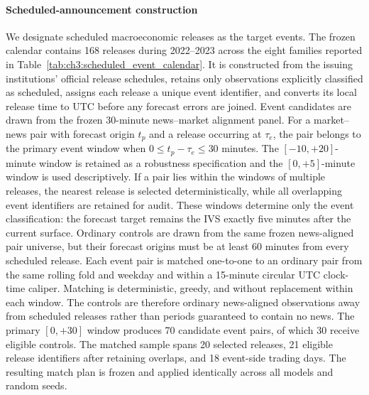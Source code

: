\paragraph*{Scheduled-announcement construction}
We designate scheduled macroeconomic releases as the target events.  The
frozen calendar contains 168 releases during 2022--2023 across the eight
families reported in Table~\ref{tab:ch3:scheduled_event_calendar}.  It is
constructed from the issuing institutions' official release schedules,
retains only observations explicitly classified as scheduled, assigns each
release a unique event identifier, and converts its local release time to UTC
before any forecast errors are joined.  Event candidates are drawn from the
frozen 30-minute news--market alignment panel.  For a market--news pair with
forecast origin $t_p$ and a release occurring at $\tau_e$, the pair belongs to
the primary event window when $0\leq t_p-\tau_e\leq30$ minutes.  The
$[-10,+20]$-minute window is retained as a robustness specification and the
$[0,+5]$-minute window is used descriptively.  If a pair lies within the
windows of multiple releases, the nearest release is selected
deterministically, while all overlapping event identifiers are retained for
audit.  These windows determine only the event classification: the forecast
target remains the IVS exactly five minutes after the current surface.
Ordinary controls are drawn from the same frozen news-aligned pair universe,
but their forecast origins must be at least 60 minutes from every scheduled
release.  Each event pair is matched one-to-one to an ordinary pair from the
same rolling fold and weekday and within a 15-minute circular UTC clock-time
caliper.  Matching is deterministic, greedy, and without replacement within
each window.  The controls are therefore ordinary news-aligned observations
away from scheduled releases rather than periods guaranteed to contain no
news.  The primary $[0,+30]$ window produces 70 candidate event pairs, of
which 30 receive eligible controls.  The matched sample spans 20 selected
releases, 21 eligible release identifiers after retaining overlaps, and 18
event-side trading days.  The resulting match plan is frozen and applied
identically across all models and random seeds.


